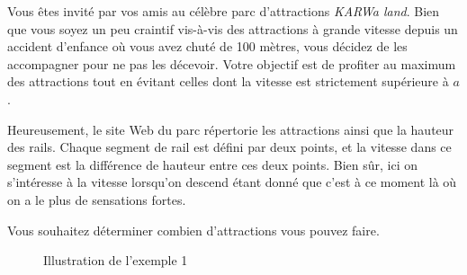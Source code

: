 \problemname{\problemyamlname}


Vous êtes invité par vos amis au célèbre parc d'attractions \textit{KARWa land}. Bien que vous soyez un peu craintif vis-à-vis des attractions à grande vitesse depuis un accident d'enfance où vous avez chuté de 100 mètres, vous décidez de les accompagner pour ne pas les décevoir. Votre objectif est de profiter au maximum des attractions tout en évitant celles dont la vitesse est strictement supérieure à $a$.

Heureusement, le site Web du parc répertorie les attractions ainsi que la hauteur des rails. Chaque segment de rail est défini par deux points, et la vitesse dans ce segment est la différence de hauteur entre ces deux points. Bien sûr, ici on s'intéresse à la vitesse lorsqu'on descend étant donné que c'est à ce moment là où on a le plus de sensations fortes.

Vous souhaitez déterminer combien d'attractions vous pouvez faire.

\begin{figure}[h]
    \centering
    \caption{Illustration de l'exemple 1}
\end{figure}

